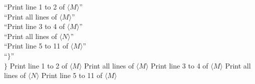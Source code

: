 \documentclass[letterpaper]{article}
\begin{document}
\begin{multicols}{2}
\begin{minipage}{0.4\textwidth}
\begin{algorithm}[H]
            \nl \hspace{1.0cm}``Print line 1 to 2 of $\langle M \rangle$''\\
            \nl \hspace{1.0cm}``Print all lines of $\langle M \rangle$''\\
            \nl \hspace{1.0cm}``Print line 3 to 4 of $\langle M \rangle$''\\
            \nl \hspace{1.0cm}``Print all lines of $\langle N \rangle$''\\
            \nl \hspace{1.0cm}``Print line 5 to 11 of $\langle M \rangle$''\\
            \nl \hspace{0.5cm}``$\}$''\\
            $ \}$\;
            Print line 1 to 2 of $\langle M \rangle$\;
            Print all lines of $\langle M \rangle$\;
            Print line 3 to 4 of $\langle M \rangle$\;
            Print all lines of $\langle N \rangle$\;
            Print line 5 to 11 of $\langle M \rangle$\;
        \end{algorithm}
    \end{minipage}
    
\end{multicols}
\end{document}
